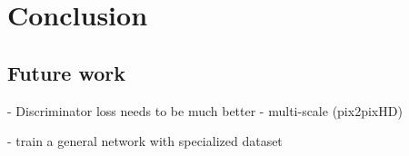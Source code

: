 \chapter{Conclusion}
\section{Future work}
- Discriminator loss
needs to be much better
- multi-scale (pix2pixHD)

- train a general network with specialized dataset
